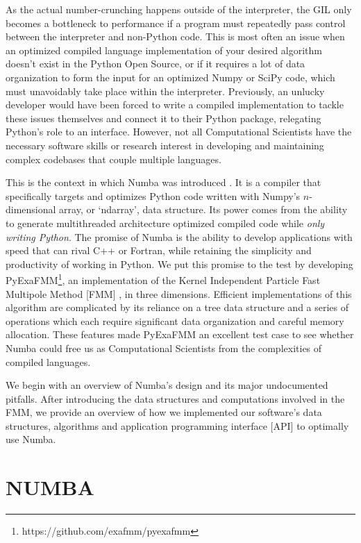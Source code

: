\documentclass{IEEEcsmag}
\begin{document}
As the actual number-crunching happens outside of the interpreter, the GIL only becomes a bottleneck to performance if a program must repeatedly pass control between the interpreter and non-Python code. This is most often an issue when an optimized compiled language implementation of your desired algorithm doesn't exist in the Python Open Source, or if it requires a lot of data organization to form the input for an optimized Numpy or SciPy code, which must unavoidably take place within the interpreter. Previously, an unlucky developer would have been forced to write a compiled implementation to tackle these issues themselves and connect it to their Python package, relegating Python's role to an interface. However, not all Computational Scientists have the necessary software skills or research interest in developing and maintaining complex codebases that couple multiple languages.

This is the context in which Numba was introduced \cite{Lam2015}. It is a compiler that specifically targets and optimizes Python code written with Numpy's $n$-dimensional array, or `ndarray', data structure. Its power comes from the ability to generate multithreaded architecture optimized compiled code while \textit{only writing Python}. The promise of Numba is the ability to develop applications with speed that can rival C++ or Fortran, while retaining the simplicity and productivity of working in Python. We put this promise to the test by developing PyExaFMM\footnote{https://github.com/exafmm/pyexafmm}, an implementation of the Kernel Independent Particle Fast Multipole Method [FMM] \cite{Ying2004,Greengard1987}, in three dimensions. Efficient implementations of this algorithm are complicated by its reliance on a tree data structure and a series of operations which each require significant data organization and careful memory allocation. These features made PyExaFMM an excellent test case to see whether Numba could free us as Computational Scientists from the complexities of compiled languages.

We begin with an overview of Numba's design and its major undocumented pitfalls. After introducing the data structures and computations involved in the FMM, we provide an overview of how we implemented our software's data structures, algorithms and application programming interface [API] to optimally use Numba.

\section{NUMBA}
\end{document}
